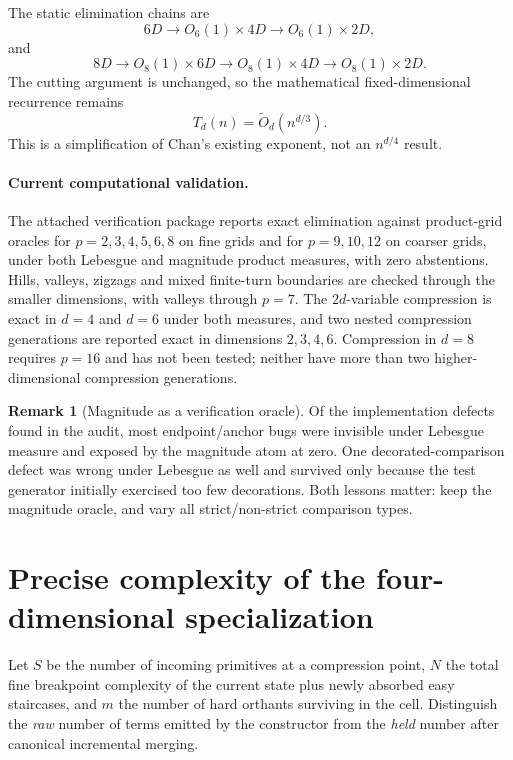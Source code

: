 \documentclass[12pt,a4paper]{article}
\theoremstyle{definition}
\newtheorem{remark}[theorem]{Remark}
\newcommand{\1}{\mathbf 1}
\begin{document}
The static elimination chains are
\[
6D\longrightarrow O_6(1)\times4D\longrightarrow O_6(1)\times2D,
\]
and
\[
8D\longrightarrow O_8(1)\times6D\longrightarrow O_8(1)\times4D\longrightarrow O_8(1)\times2D.
\]
The cutting argument is unchanged, so the mathematical fixed-dimensional recurrence remains
\begin{equation}
\boxed{T_d(n)=\widetilde O_d(n^{d/3}).}                         \label{eq:generaltime}
\end{equation}
This is a simplification of Chan's existing exponent, not an $n^{d/4}$ result.

\paragraph{Current computational validation.}
The attached verification package reports exact elimination against product-grid oracles for $p=2,3,4,5,6,8$ on fine grids and for $p=9,10,12$ on coarser grids, under both Lebesgue and magnitude product measures, with zero abstentions. Hills, valleys, zigzags and mixed finite-turn boundaries are checked through the smaller dimensions, with valleys through $p=7$. The $2d$-variable compression is exact in $d=4$ and $d=6$ under both measures, and two nested compression generations are reported exact in dimensions $2,3,4,6$. Compression in $d=8$ requires $p=16$ and has not been tested; neither have more than two higher-dimensional compression generations.

\begin{remark}[Magnitude as a verification oracle]
Of the implementation defects found in the audit, most endpoint/anchor bugs were invisible under Lebesgue measure and exposed by the magnitude atom at zero. One decorated-comparison defect was wrong under Lebesgue as well and survived only because the test generator initially exercised too few decorations. Both lessons matter: keep the magnitude oracle, and vary all strict/non-strict comparison types.
\end{remark}

\section{Precise complexity of the four-dimensional specialization}

Let $S$ be the number of incoming primitives at a compression point, $N$ the total fine breakpoint complexity of the current state plus newly absorbed easy staircases, and $m$ the number of hard orthants surviving in the cell. Distinguish the \emph{raw} number of terms emitted by the constructor from the \emph{held} number after canonical incremental merging.
\end{document}
